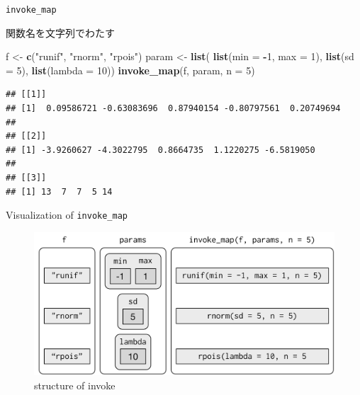 \documentclass[ignorenonframetext,]{beamer}
\newenvironment{Shaded}{\begin{snugshade}}{\end{snugshade}}
\newcommand{\KeywordTok}[1]{\textcolor[rgb]{0.13,0.29,0.53}{\textbf{#1}}}
\newcommand{\DataTypeTok}[1]{\textcolor[rgb]{0.13,0.29,0.53}{#1}}
\newcommand{\DecValTok}[1]{\textcolor[rgb]{0.00,0.00,0.81}{#1}}
\newcommand{\StringTok}[1]{\textcolor[rgb]{0.31,0.60,0.02}{#1}}
\newcommand{\OperatorTok}[1]{\textcolor[rgb]{0.81,0.36,0.00}{\textbf{#1}}}
\newcommand{\NormalTok}[1]{#1}
\begin{document}
\begin{frame}[fragile]{\texttt{invoke\_map}}

関数名を文字列でわたす

\begin{Shaded}
\begin{Highlighting}[]
\NormalTok{f <-}\StringTok{ }\KeywordTok{c}\NormalTok{(}\StringTok{"runif"}\NormalTok{, }\StringTok{"rnorm"}\NormalTok{, }\StringTok{"rpois"}\NormalTok{)}
\NormalTok{param <-}\StringTok{ }\KeywordTok{list}\NormalTok{(}
          \KeywordTok{list}\NormalTok{(}\DataTypeTok{min =} \OperatorTok{-}\DecValTok{1}\NormalTok{, }\DataTypeTok{max =} \DecValTok{1}\NormalTok{), }
          \KeywordTok{list}\NormalTok{(}\DataTypeTok{sd =} \DecValTok{5}\NormalTok{), }
          \KeywordTok{list}\NormalTok{(}\DataTypeTok{lambda =} \DecValTok{10}\NormalTok{))}
\KeywordTok{invoke_map}\NormalTok{(f, param, }\DataTypeTok{n =} \DecValTok{5}\NormalTok{)}
\end{Highlighting}
\end{Shaded}

\begin{verbatim}
## [[1]]
## [1]  0.09586721 -0.63083696  0.87940154 -0.80797561  0.20749694
## 
## [[2]]
## [1] -3.9260627 -4.3022795  0.8664735  1.1220275 -6.5819050
## 
## [[3]]
## [1] 13  7  7  5 14
\end{verbatim}

\end{frame}

\begin{frame}{Visualization of \texttt{invoke\_map}}

\begin{figure}
\centering
\includegraphics{../img/lists-invoke.png}
\caption{structure of invoke}
\end{figure}

\end{frame}
\end{document}
